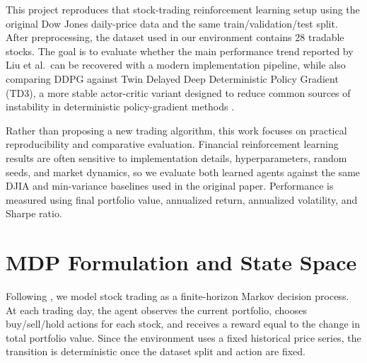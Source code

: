 \documentclass{article}
\begin{document}
% 
This project reproduces that stock-trading reinforcement learning setup using the original Dow Jones daily-price data and the same train/validation/test split. After preprocessing, the dataset used in our environment contains 28 tradable stocks. The goal is to evaluate whether the main performance trend reported by Liu et al.\ can be recovered with a modern implementation pipeline, while also comparing DDPG against Twin Delayed Deep Deterministic Policy Gradient (TD3), a more stable actor-critic variant designed to reduce common sources of instability in deterministic policy-gradient methods \cite{fujimoto2018}.


Rather than proposing a new trading algorithm, this work focuses on practical reproducibility and comparative evaluation. Financial reinforcement learning results are often sensitive to implementation details, hyperparameters, random seeds, and market dynamics, so we evaluate both learned agents against the same DJIA and min-variance baselines used in the original paper. Performance is measured using final portfolio value, annualized return, annualized volatility, and Sharpe ratio.


\section{MDP Formulation and State Space}

Following \cite{liu2018practical}, we model stock trading as a finite-horizon Markov decision process. At each trading day, the agent observes the current portfolio, chooses buy/sell/hold actions for each stock, and receives a reward equal to the change in total portfolio value. Since the environment uses a fixed historical price series, the transition is deterministic once the dataset split and action are fixed.
\end{document}
